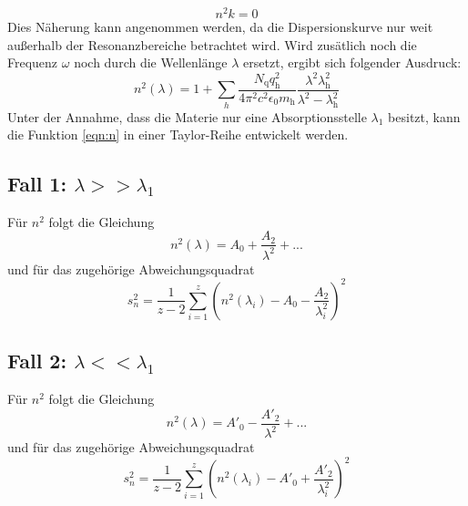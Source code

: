 \begin{equation*}
  n^2 k = 0
\end{equation*}
Dies Näherung kann angenommen werden, da die Dispersionskurve nur weit außerhalb der Resonanzbereiche betrachtet wird.
Wird zusätlich noch die Frequenz $\omega$ noch durch die Wellenlänge $\lambda$ ersetzt, ergibt sich folgender Ausdruck:
\begin{equation}
  n^2(\lambda) = 1 + \sum_h \frac{N_\text{q} q^2_\text{h}}{4 \pi^2 c^2 \epsilon_0 m_\text{h}} \frac{\lambda^2 \lambda^2_\text{h}}{\lambda^2 - \lambda^2_\text{h}}
  \label{eqn:n}
\end{equation}
Unter der Annahme, dass die Materie nur eine Absorptionsstelle $\lambda_1$ besitzt, kann die Funktion \eqref{eqn:n} in einer Taylor-Reihe entwickelt werden.

\subsection{Fall 1: \texorpdfstring{$\lambda >> \lambda_1$}{g}}

Für $n^2$ folgt die Gleichung
\begin{equation}
  n^2(\lambda) = A_0 + \frac{A_2}{\lambda^2} + ...
\end{equation}
und für das zugehörige Abweichungsquadrat
\begin{equation}
 s^2_n = \frac{1}{z-2} \sum_{i=1}^z \left(n^2(\lambda_i) - A_0 - \frac{A_2}{\lambda^2_i}\right)^2
 \label{eqn:gl1}
\end{equation}

\subsection{Fall 2: \texorpdfstring{$\lambda << \lambda_1$}{k}}

Für $n^2$ folgt die Gleichung
\begin{equation}
  n^2(\lambda) = A'_0 - \frac{A'_2}{\lambda^2} + ...
\end{equation}
und für das zugehörige Abweichungsquadrat
\begin{equation}
  s^2_n = \frac{1}{z-2} \sum_{i=1}^z \left(n^2(\lambda_i) - A'_0 + \frac{A'_2}{\lambda^2_i}\right)^2
  \label{eqn:gl2}
\end{equation}

